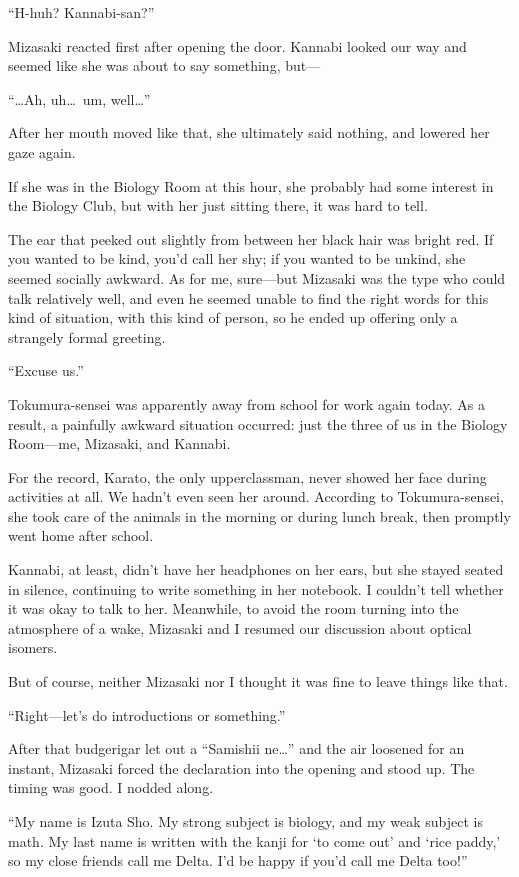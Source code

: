 \documentclass[
    a4paper,
    12pt,
    twoside,
    openany,
    UTF8,
    fontset=windows
]{ctexbook}
\begin{document}
``H-huh? Kannabi-san?''

Mizasaki reacted first after opening the door. Kannabi looked our way and seemed like she was about to say something, but---

``\dots Ah, uh\dots\ um, well\dots''

After her mouth moved like that, she ultimately said nothing, and lowered her gaze again.

If she was in the Biology Room at this hour, she probably had some interest in the Biology Club, but with her just sitting there, it was hard to tell.

The ear that peeked out slightly from between her black hair was bright red. If you wanted to be kind, you'd call her shy; if you wanted to be unkind, she seemed socially awkward. As for me, sure---but Mizasaki was the type who could talk relatively well, and even he seemed unable to find the right words for this kind of situation, with this kind of person, so he ended up offering only a strangely formal greeting.

``Excuse us.''

Tokumura-sensei was apparently away from school for work again today. As a result, a painfully awkward situation occurred: just the three of us in the Biology Room---me, Mizasaki, and Kannabi.

For the record, Karato, the only upperclassman, never showed her face during activities at all. We hadn't even seen her around. According to Tokumura-sensei, she took care of the animals in the morning or during lunch break, then promptly went home after school.

Kannabi, at least, didn't have her headphones on her ears, but she stayed seated in silence, continuing to write something in her notebook. I couldn't tell whether it was okay to talk to her. Meanwhile, to avoid the room turning into the atmosphere of a wake, Mizasaki and I resumed our discussion about optical isomers.

But of course, neither Mizasaki nor I thought it was fine to leave things like that.

``Right---let's do introductions or something.''

After that budgerigar let out a ``Samishii ne\dots'' and the air loosened for an instant, Mizasaki forced the declaration into the opening and stood up. The timing was good. I nodded along.

``My name is Izuta Sho. My strong subject is biology, and my weak subject is math. My last name is written with the kanji for `to come out' and `rice paddy,' so my close friends call me Delta. I'd be happy if you'd call me Delta too!''
\end{document}
